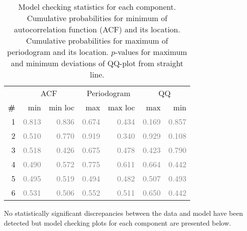 \documentclass{article} %
\begin{document}
\begin{table}[htb]
\begin{center}
{\small
\begin{tabular}{|r|rr|rr|rr|}
\hline
 & \multicolumn{2}{|c|}{ACF} & \multicolumn{2}{|c|}{Periodogram} & \multicolumn{2}{|c|}{QQ} \\
\bf{\#} & {min} & {min loc} & {max} & {max loc} & {max} & {min}\\
\hline

1 & \textcolor{gray}{0.813} & \textcolor{gray}{0.836} & \textcolor{gray}{0.674} & \textcolor{gray}{0.434} & \textcolor{gray}{0.169} & \textcolor{gray}{0.857}\\

2 & \textcolor{gray}{0.510} & \textcolor{gray}{0.770} & \textcolor{gray}{0.919} & \textcolor{gray}{0.340} & \textcolor{gray}{0.929} & \textcolor{gray}{0.108}\\

3 & \textcolor{gray}{0.518} & \textcolor{gray}{0.426} & \textcolor{gray}{0.675} & \textcolor{gray}{0.478} & \textcolor{gray}{0.423} & \textcolor{gray}{0.790}\\

4 & \textcolor{gray}{0.490} & \textcolor{gray}{0.572} & \textcolor{gray}{0.775} & \textcolor{gray}{0.611} & \textcolor{gray}{0.664} & \textcolor{gray}{0.442}\\

5 & \textcolor{gray}{0.495} & \textcolor{gray}{0.519} & \textcolor{gray}{0.494} & \textcolor{gray}{0.482} & \textcolor{gray}{0.507} & \textcolor{gray}{0.493}\\

6 & \textcolor{gray}{0.531} & \textcolor{gray}{0.506} & \textcolor{gray}{0.552} & \textcolor{gray}{0.511} & \textcolor{gray}{0.650} & \textcolor{gray}{0.442}\\

\hline
\end{tabular}
\caption{
Model checking statistics for each component.
Cumulative probabilities for minimum of autocorrelation function (ACF) and its location.
Cumulative probabilities for maximum of periodogram and its location.
$p$-values for maximum and minimum deviations of QQ-plot from straight line.
}
\label{table:check}
}
\end{center}
\end{table}

No statistically significant discrepancies between the data and model have been detected but model checking plots for each component are presented below.
\end{document}
